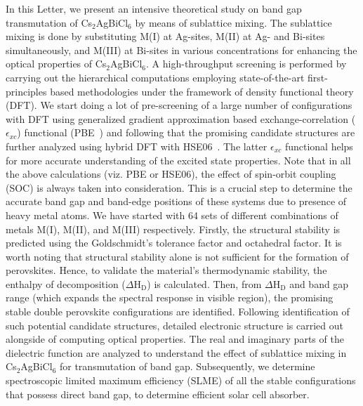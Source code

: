 \documentclass[journal=jpclcd,manuscript=letter]{achemso}
\begin{document}
In this Letter,
we present an intensive theoretical study on band gap transmutation of Cs$_{2}$AgBiCl$_{6}$ by means of sublattice mixing. The sublattice mixing is done by substituting M(I) at Ag-sites, M(II) at Ag- and Bi-sites simultaneously, and M(III) at Bi-sites in various concentrations for enhancing the optical properties of Cs$_{2}$AgBiCl$_{6}$. A high-throughput screening is performed by carrying out the hierarchical computations employing state-of-the-art first-principles based methodologies under the framework of density functional theory (DFT). We start doing a lot of pre-screening of a large number of configurations with DFT using generalized gradient approximation based exchange-correlation ($\epsilon_{xc}$) functional (PBE~\cite{perdew1992atoms}) and following that the promising candidate structures are further analyzed using hybrid DFT with HSE06~\cite{heyd2003hybrid}. The latter $\epsilon_{xc}$ functional helps for more accurate understanding of the excited state properties. Note that in all the above calculations (viz. PBE or HSE06), the effect of spin-orbit coupling (SOC) is always taken into consideration. This is a crucial step to determine the accurate band gap and band-edge positions of these systems due to presence of heavy metal atoms.
We have started with 64 sets of different combinations of metals M(I), M(II), and M(III)  respectively. Firstly, the structural stability is predicted using the Goldschmidt's tolerance factor and octahedral factor. It is worth noting that structural stability alone is not sufficient for the formation of perovskites. Hence, to validate the material's thermodynamic stability, the enthalpy of decomposition ($\Delta$H$_{\textrm{D}}$) is calculated. Then, from $\Delta$H$_{\textrm{D}}$ and band gap range (which expands the spectral response in visible region), the promising stable double perovskite configurations are identified.
Following identification of such potential candidate structures, detailed electronic structure is carried out alongside of computing optical properties. The real and imaginary parts of the dielectric function are analyzed to understand the effect of sublattice mixing in Cs$_{2}$AgBiCl$_{6}$ for transmutation of band gap. Subsequently, we determine spectroscopic limited maximum efficiency (SLME) of all the stable configurations that possess direct band gap, to determine efficient solar cell absorber. 
\end{document}
